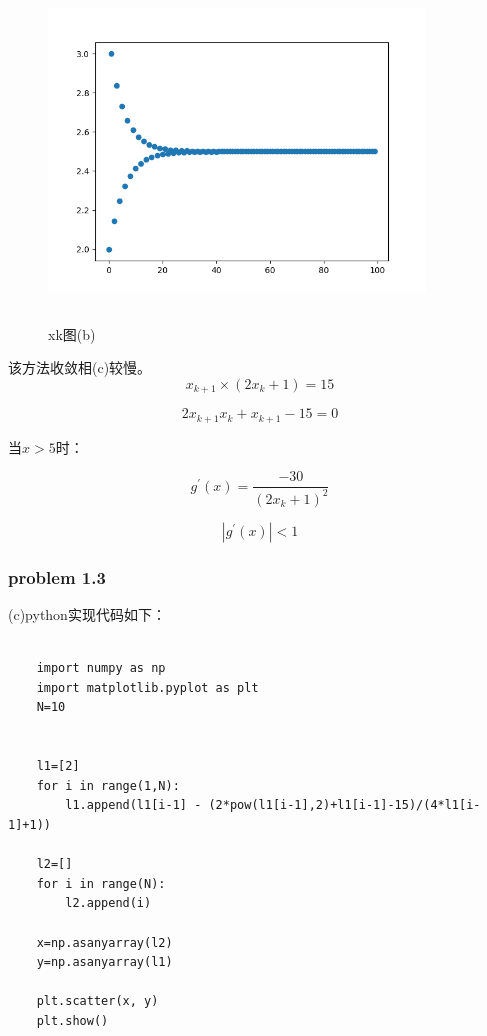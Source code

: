 \documentclass[UTF8]{ctexart}
\begin{document}
\begin{figure}[H]
 \centering
  \includegraphics[width=10cm,height=9cm]{2-1-2.png}
  \caption{xk图(b)}
\end{figure}

该方法收敛相(c)较慢。
$$
x_{k+1} \times (2x_k+1)=15
$$


$$
2x_{k+1}x_{k}+x_{k+1}-15=0
$$

当$x>5$时：

$$
g^{\prime} (x)=\frac{-30}{(2x_k+1)^2}
$$


$$
|g^{\prime} (x)|<1
$$



\subsubsection{problem 1.3}



(c)python实现代码如下：
\begin{lstlisting}

	import numpy as np
	import matplotlib.pyplot as plt
	N=10


	l1=[2]
	for i in range(1,N):
	    l1.append(l1[i-1] - (2*pow(l1[i-1],2)+l1[i-1]-15)/(4*l1[i-1]+1))

	l2=[]
	for i in range(N):
	    l2.append(i)

	x=np.asanyarray(l2)
	y=np.asanyarray(l1)

	plt.scatter(x, y)
	plt.show()
\end{lstlisting}
\end{document}
